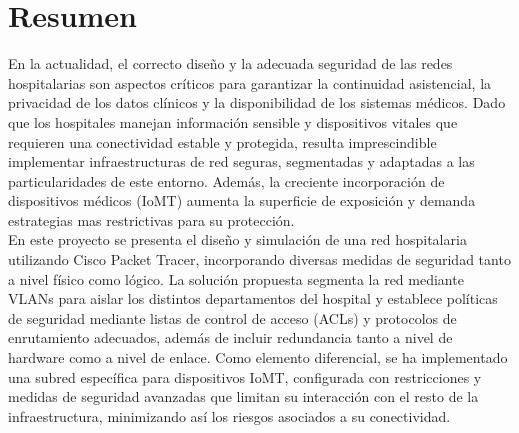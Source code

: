
\chapter{Resumen}

En la actualidad, el correcto diseño y la adecuada seguridad de las redes hospitalarias son aspectos críticos para garantizar la continuidad asistencial, 
la privacidad de los datos clínicos y la disponibilidad de los sistemas médicos. Dado que los hospitales manejan información sensible y dispositivos 
vitales que requieren una conectividad estable y protegida, resulta imprescindible implementar infraestructuras de red seguras, segmentadas y adaptadas a las 
particularidades de este entorno. Además, la creciente incorporación de dispositivos médicos (IoMT) aumenta la superficie de exposición y demanda 
estrategias mas restrictivas para su protección. \\

En este proyecto se presenta el diseño y simulación de una red hospitalaria utilizando Cisco Packet Tracer, incorporando diversas medidas de seguridad tanto a 
nivel físico como lógico. La solución propuesta segmenta la red mediante VLANs para aislar los distintos departamentos del hospital y establece políticas de 
seguridad mediante listas de control de acceso (ACLs) y protocolos de enrutamiento adecuados, además de incluir redundancia tanto a nivel de hardware como a 
nivel de enlace. Como elemento diferencial, se ha implementado una subred específica para dispositivos IoMT, configurada con restricciones y medidas de seguridad 
avanzadas que limitan su interacción con el resto de la infraestructura, minimizando así los riesgos asociados a su conectividad.